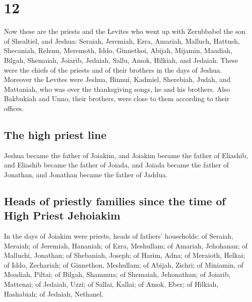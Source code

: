 \hypertarget{section-11}{%
\section{12}\label{section-11}}

 Now these are the priests and the Levites who went up
with Zerubbabel the son of Shealtiel, and Jeshua: Seraiah, Jeremiah,
Ezra,  Amariah, Malluch, Hattush, 
Shecaniah, Rehum, Meremoth,  Iddo, Ginnethoi, Abijah,
 Mijamin, Maadiah, Bilgah,  Shemaiah,
Joiarib, Jedaiah,  Sallu, Amok, Hilkiah, and Jedaiah.
These were the chiefs of the priests and of their brothers in the days
of Jeshua.  Moreover the Levites were Jeshua, Binnui,
Kadmiel, Sherebiah, Judah, and Mattaniah, who was over the thanksgiving
songs, he and his brothers.  Also Bakbukiah and Unno,
their brothers, were close to them according to their offices.

\hypertarget{the-high-priest-line}{%
\subsection{The high priest line}\label{the-high-priest-line}}

 Jeshua became the father of Joiakim, and Joiakim became
the father of Eliashib, and Eliashib became the father of Joiada,
 and Joiada became the father of Jonathan, and Jonathan
became the father of Jaddua.

\hypertarget{heads-of-priestly-families-since-the-time-of-high-priest-jehoiakim}{%
\subsection{Heads of priestly families since the time of High Priest
Jehoiakim}\label{heads-of-priestly-families-since-the-time-of-high-priest-jehoiakim}}

 In the days of Joiakim were priests, heads of fathers'
households: of Seraiah, Meraiah; of Jeremiah, Hananiah; 
of Ezra, Meshullam; of Amariah, Jehohanan;  of Malluchi,
Jonathan; of Shebaniah, Joseph;  of Harim, Adna; of
Meraioth, Helkai;  of Iddo, Zechariah; of Ginnethon,
Meshullam;  of Abijah, Zichri; of Miniamin, of Moadiah,
Piltai;  of Bilgah, Shammua; of Shemaiah, Jehonathan;
 of Joiarib, Mattenai; of Jedaiah, Uzzi; 
of Sallai, Kallai; of Amok, Eber;  of Hilkiah, Hashabiah;
of Jedaiah, Nethanel.

